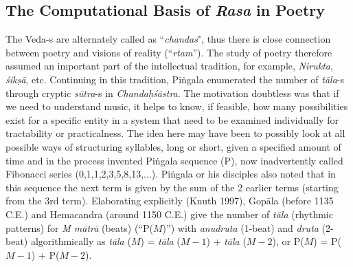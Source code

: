 \subsection{The Computational Basis of \textsl{Rasa} in Poetry}\label{chap3-sec5.1}

The Veda-s are alternately called as “\textsl{chandas}", thus there is close connection between poetry and visions of reality (“\textsl{rtam}”). The study of poetry therefore assumed an important part of the intellectual tradition, for example, \textsl{Nirukta}, \textsl{śikṣā}, etc. Continuing in this tradition, Piṅgala enumerated the number of \textsl{tāla}-s through cryptic \textsl{sūtra}-s in \textsl{Chandaḥśāstra}. The motivation doubtless was that if we need to understand music, it helps to know, if feasible, how many possibilities exist for a specific entity in a system that need to be examined individually for tractability or practicalness. The idea here may have been to possibly look at all possible ways of structuring syllables, long or short, given a specified amount of time and in the process invented Piṅgala sequence (P), now inadvertently called Fibonacci series (0,1,1,2,3,5,8,13,...). Piṅgala or his disciples also noted that in this sequence the next term is given by the sum of the 2 earlier terms (starting from the 3rd term). Elaborating explicitly (Knuth 1997), Gopāla (before 1135 C.E.) and Hemacandra (around 1150 C.E.) give the number of \textsl{tāla} (rhythmic patterns) for \textsl{M mātrā} (beats) (“P($M$)”) with \textsl{anudruta} (1-beat) and \textsl{druta} (2-beat) algorithmically as \textsl{tāla} ($M$) = \textsl{tāla} ($M-1$) + \textsl{tāla} ($M-2$), or P($M$) = P($M-1$) + P($M-2$).

